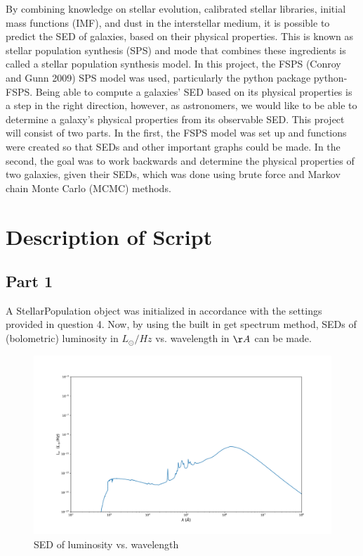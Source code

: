 \documentclass{article}
\begin{document}
By combining knowledge on stellar evolution, calibrated stellar libraries, initial mass functions
(IMF), and dust in the interstellar medium, it is possible to predict the SED of galaxies, based on
their physical properties. This is known as stellar population synthesis (SPS) and mode that
combines these ingredients is called a stellar population synthesis model. In this project,
the FSPS (Conroy and Gunn 2009) SPS model was used, particularly the python package python-FSPS.
Being able to compute a galaxies' SED based on its physical properties is a step in the right direction,
however, as astronomers, we would like to be able to determine a galaxy's physical properties from
its observable SED. This project will consist of two parts. In the first, the FSPS model was set up
and functions were created so that SEDs and other important graphs could be made. In the second,
the goal was to work backwards and determine the physical properties of two galaxies, given their SEDs, which was done using
brute force and Markov chain Monte Carlo (MCMC) methods.

\section*{Description of Script}
\subsection*{Part 1}

A StellarPopulation object was initialized in accordance with the settings provided in question 4.
Now, by using the built in get spectrum method, SEDs of (bolometric) luminosity in $L_\odot/Hz$
vs. wavelength in $\AA$ can be made.

\begin{figure}[h]
  \centering
\includegraphics[scale=0.3]{SED Default Units}
\caption{SED of luminosity vs. wavelength}
\end{figure}
\end{document}
